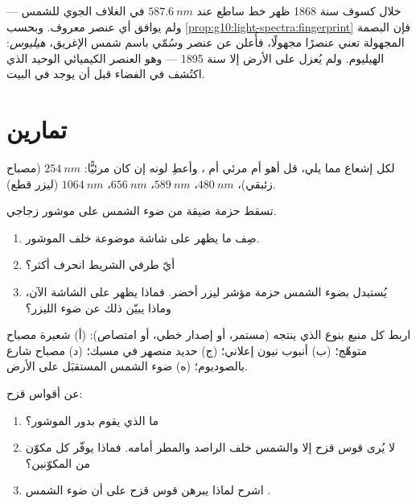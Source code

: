 \begin{remark}\label{rem:g10:light-spectra:helium}
خلال كسوف سنة 1868 ظهر خط ساطع عند $\qty{587.6}{nm}$
في  الغلاف الجوي للشمس --- ولم يوافق أي عنصر معروف. وبحسب
\cref{prop:g10:light-spectra:fingerprint} فإن البصمة المجهولة تعني عنصرًا
مجهولًا، فأُعلن عن عنصر وسُمّي باسم شمس الإغريق،
\emph{هيليوس}: الهيليوم. ولم يُعزل على الأرض إلا سنة 1895 ---
وهو العنصر الكيميائي الوحيد الذي اكتُشف في الفضاء قبل أن يوجد في البيت.
\end{remark}

\section{تمارين}

\begin{exercise}[$\star$]\label{exo:g10:light-spectra:1}
لكل إشعاع مما يلي، قل أهو  أم مرئي أم ،
وأعطِ لونه إن كان مرئيًّا: $\qty{254}{nm}$ (مصباح زئبقي)،
$\qty{480}{nm}$، $\qty{589}{nm}$، $\qty{656}{nm}$، $\qty{1064}{nm}$
(ليزر قطع).
\end{exercise}

\begin{exercise}[$\star$]\label{exo:g10:light-spectra:2}
تسقط حزمة ضيقة من ضوء الشمس على موشور زجاجي.
\begin{enumerate}
  \item صِف ما يظهر على شاشة موضوعة خلف الموشور.
  \item أيّ طرفي الشريط انحرف أكثر؟
  \item يُستبدل بضوء الشمس حزمة مؤشر ليزر أخضر.
        فماذا يظهر على الشاشة الآن، وماذا يبيّن ذلك عن
        ضوء الليزر؟
\end{enumerate}
\end{exercise}

\begin{exercise}[$\star$]\label{exo:g10:light-spectra:3}
اربط كل منبع بنوع  الذي ينتجه (مستمر، أو إصدار
خطي، أو امتصاص): (أ) شعيرة مصباح متوهّج؛
(ب) أنبوب نيون إعلاني؛ (ج) حديد منصهر في مسبك؛ (د) مصباح شارع
بالصوديوم؛ (ه) ضوء الشمس المستقبَل على الأرض.
\end{exercise}

\begin{exercise}[$\star$]\label{exo:g10:light-spectra:4}
عن أقواس قزح:
\begin{enumerate}
  \item ما الذي يقوم بدور الموشور؟
  \item لا يُرى قوس قزح إلا والشمس خلف الراصد والمطر
        أمامه. فماذا يوفّر كل مكوّن من المكوّنين؟
  \item اشرح لماذا يبرهن قوس قزح على أن ضوء الشمس .
\end{enumerate}
\end{exercise}

